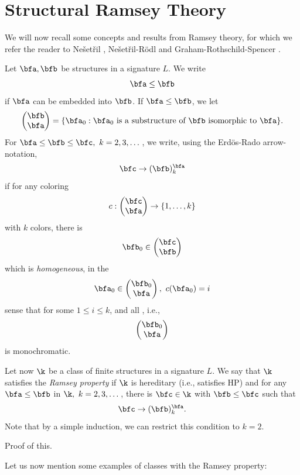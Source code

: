 \chapter{Structural Ramsey Theory}

We will now recall some concepts and results from Ramsey theory, for which
we refer the reader to Ne\v{s}et\v{r}il \cite{N95}, Ne\v{s}et\v{r}il-R\"odl
\cite{NR90} and Graham-Rothschild-Spencer \cite{GRS}.

Let $\bfa ,\bfb$ be structures in a signature $L$.  We write
\[
    \bfa\leq\bfb
\]
if $\bfa$ can be embedded into $\bfb$.  If $\bfa\leq\bfb$, we let
\[
    \begin{pmatrix}\bfb\\ \bfa\end{pmatrix}=\{\bfa_0:\bfa_0\text{ is a
        substructure of }\bfb\text{ isomorphic to }\bfa\}.
\]
For $\bfa\leq\bfb\leq\bfc ,\ k=2,3,\dots$, we write, using the Erd\"{o}s-Rado \cite{ER56} arrow-notation,
\[
    \bfc\rightarrow (\bfb )^\bfa_k
\]
if for any coloring
\[
    c:\begin{pmatrix}\bfc\\ \bfa\end{pmatrix}
    \rightarrow\{1,\dots ,k\}
\]
with $k$ colors, there is
\[
    \bfb_0\in
    \begin{pmatrix}\bfc \\ \bfb\end{pmatrix}
\]
which is {\it homogeneous}, in the
\[
    \bfa_0\in\begin{pmatrix}
        \bfb_0\\ \bfa\end{pmatrix},\ c(\bfa_0)=i
\]
sense that for some $1\leq i\leq k$, and all , i.e.,
\[
    \begin{pmatrix}\bfb_0 \\
        \bfa\end{pmatrix}
\]
is monochromatic.

Let now $\k$ be a class of finite structures in a signature $L$.  We
say that $\k$ satisfies the {\it Ramsey property} if $\k$ is hereditary (i.e., satisfies HP) and for any $\bfa
    \leq\bfb$ in $\k ,\ k=2,3,\dots$, there is $\bfc\in\k$ with $\bfb\leq\bfc$
such that
\[
    \bfc\rightarrow (\bfb )^\bfa_k.
\]
Note that by a simple induction, we can restrict this condition to $k=2$.
\begin{mynote}
    Proof of this.
\end{mynote}
Let us now mention some examples of classes with the Ramsey property:

